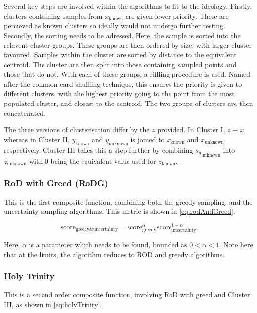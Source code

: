 Several key steps are involved within the algorithms to fit to the ideology. Firstly, clusters containing samples from $x_\mathrm{known}$ are given lower priority. These are percieved as known clusters so ideally would not undergo further testing. Secondly, the sorting needs to be adressed. Here, the sample is sorted into the relavent cluster groups. These groups are then ordered by size, with larger cluster favoured. Samples within the cluster are sorted by distance to the equivalent centroid. The cluster are then split into those containing sampled points and those that do not. With each of these groups, a riffling procedure is used. Named after the common card shuffling technique, this ensures the priority is given to different clusters, with the highest priority going to the point from the most populated cluster, and closest to the centroid. The two groups of clusters are then concatenated.

The three versions of clusterisation differ by the $z$ provided. In Cluster I, $z\equiv{}x$ whereas in Cluster II, $y_\mathrm{known}$ and $y_\mathrm{unknown}$ is joined to $x_\mathrm{known}$ and $x_\mathrm{unknown}$ respectively. Cluster III takes this a step further by combining ${s_g}_\mathrm{unknown}$ into $z_\mathrm{unknown}$ with 0 being the equivalent value used for $z_\mathrm{known}$.

\subsubsection{RoD with Greed (RoDG)}
This is the first composite function, combining both the greedy sampling, and the uncertainty sampling algorithms. This metric is shown in \ref{eq:rodAndGreed}.

\begin{equation}
  \label{eq:rodAndGreed}
  {\mathrm{score}_\mathrm{greedy\&uncertainty}=\mathrm{score}_\mathrm{greedy}^{\alpha}\mathrm{score}_\mathrm{uncertainty}^{1-\alpha}}
\end{equation}

Here, $\alpha$ is a parameter which needs to be found, bounded as $0<\alpha{}<1$. Note here that at the limits, the algorithm reduces to ROD and greedy algorithms.

\subsubsection{Holy Trinity}
This is a second order composite function, involving RoD with greed and Cluster III, as shown in \ref{eq:holyTrinity}.


